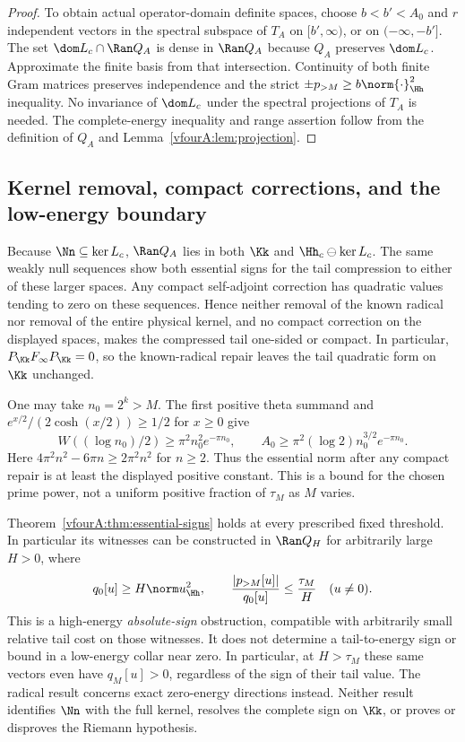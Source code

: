 \begin{proof}
To obtain actual operator-domain definite spaces, choose
$b<b'<A_0$ and $r$ independent vectors in the spectral subspace of
$T_A$ on $[b',\infty)$, or on $(-\infty,-b']$.
The set $\dom L_c\cap\Ran Q_A$ is dense in $\Ran Q_A$ because
$Q_A$ preserves $\dom L_c$.  Approximate the finite basis from
that intersection.  Continuity of both finite Gram matrices
preserves independence and the strict $\pm p_{>M}\ge
b\norm{\cdot}_{\Hh}^2$ inequality.  No invariance of $\dom L_c$
under the spectral projections of $T_A$ is needed.
The complete-energy inequality and range assertion follow from
the definition of $Q_A$ and Lemma~\ref{vfourA:lem:projection}.
\end{proof}

\subsection{Kernel removal, compact corrections, and the low-energy boundary}
\label{vfourA:subsec:scope}

Because $\Nn\subseteq\ker L_c$, $\Ran Q_A$ lies in both $\Kk$ and
$\Hh_c\ominus\ker L_c$.  The same weakly null sequences show both
essential signs for the tail compression to either of these larger
spaces.  Any compact self-adjoint correction has quadratic values
tending to zero on these sequences.  Hence neither removal of the
known radical nor removal of the entire physical kernel, and no
compact correction on the displayed spaces, makes the compressed
tail one-sided or compact.  In particular,
$P_\Kk F_\infty P_\Kk=0$, so the known-radical repair leaves the
tail quadratic form on $\Kk$ unchanged.

One may take $n_0=2^k>M$.  The first positive theta summand and
$e^{x/2}/(2\cosh(x/2))\ge1/2$ for $x\ge0$ give
\[
 W((\log n_0)/2)\ge\pi^2n_0^2e^{-\pi n_0},\qquad
 A_0\ge\pi^2(\log2)n_0^{3/2}e^{-\pi n_0}.
\]
Here $4\pi^2n^2-6\pi n\ge2\pi^2n^2$ for $n\ge2$.
Thus the essential norm after any compact repair is at least the
displayed positive constant.  This is a bound for the chosen prime
power, not a uniform positive fraction of $\tau_M$ as $M$ varies.

Theorem~\ref{vfourA:thm:essential-signs} holds at every prescribed
fixed threshold.  In particular its witnesses can be constructed
in $\Ran Q_H$ for arbitrarily large $H>0$, where
\[
 q_0[u]\ge H\norm u_{\Hh}^2,\qquad
 \frac{|p_{>M}[u]|}{q_0[u]}\le\frac{\tau_M}{H}
 \quad(u\ne0).
\]
This is a high-energy \emph{absolute-sign} obstruction, compatible
with arbitrarily small relative tail cost on those witnesses.  It
does not determine a tail-to-energy sign or bound in a low-energy
collar near zero.  In particular, at $H>\tau_M$ these same vectors
even have $q_M[u]>0$, regardless of the sign of their tail value.
The radical result concerns exact zero-energy directions instead.
Neither result identifies $\Nn$ with the full kernel, resolves the
complete sign on $\Kk$, or proves or disproves the Riemann hypothesis.
